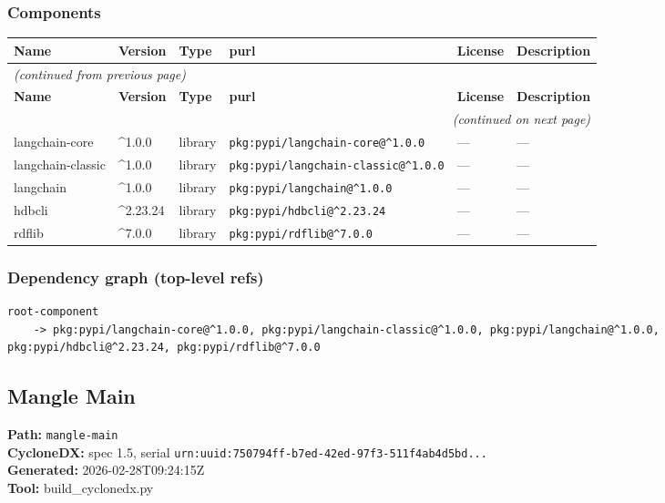 \documentclass[11pt,a4paper]{article}
\begin{document}
\subsubsection*{Components}
\begin{longtable}{|p{4cm}|p{2cm}|p{1.6cm}|p{5cm}|p{1.5cm}|p{3.5cm}|}
\toprule
\rowcolor{sbomhdr}\textbf{Name} & \textbf{Version} & \textbf{Type} & \textbf{purl} & \textbf{License} & \textbf{Description} \\
\midrule
\endfirsthead
\multicolumn{6}{l}{\small\itshape (continued from previous page)} \\
\toprule
\rowcolor{sbomhdr}\textbf{Name} & \textbf{Version} & \textbf{Type} & \textbf{purl} & \textbf{License} & \textbf{Description} \\
\midrule
\endhead
\midrule
\multicolumn{6}{r}{\small\itshape (continued on next page)} \\
\endfoot
\bottomrule
\endlastfoot
\raggedright langchain-core & \textasciicircum{}1.0.0 & library & \small\texttt{pkg:pypi/langchain-core@\textasciicircum{}1.0.0} & — & \small — \\
\raggedright langchain-classic & \textasciicircum{}1.0.0 & library & \small\texttt{pkg:pypi/langchain-classic@\textasciicircum{}1.0.0} & — & \small — \\
\raggedright langchain & \textasciicircum{}1.0.0 & library & \small\texttt{pkg:pypi/langchain@\textasciicircum{}1.0.0} & — & \small — \\
\raggedright hdbcli & \textasciicircum{}2.23.24 & library & \small\texttt{pkg:pypi/hdbcli@\textasciicircum{}2.23.24} & — & \small — \\
\raggedright rdflib & \textasciicircum{}7.0.0 & library & \small\texttt{pkg:pypi/rdflib@\textasciicircum{}7.0.0} & — & \small — \\
\end{longtable}

\subsubsection*{Dependency graph (top-level refs)}
\begin{lstlisting}[style=depgraph]
  root-component
    -> pkg:pypi/langchain-core@^1.0.0, pkg:pypi/langchain-classic@^1.0.0, pkg:pypi/langchain@^1.0.0, pkg:pypi/hdbcli@^2.23.24, pkg:pypi/rdflib@^7.0.0
\end{lstlisting}

\subsection{Mangle Main}
\textbf{Path:} \texttt{mangle-main}
\\ \textbf{CycloneDX:} spec 1.5, serial \texttt{urn:uuid:750794ff-b7ed-42ed-97f3-511f4ab4d5bd...}
\\ \textbf{Generated:} 2026-02-28T09:24:15Z
\\ \textbf{Tool:} build\_cyclonedx.py
\end{document}
